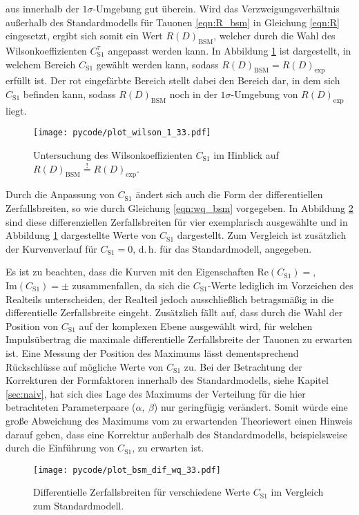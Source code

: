 aus \cite{Hiller2016} innerhalb der $\num{1}\sigma$-Umgebung gut überein.
Wird das Verzweigungsverhältnis außerhalb des Standardmodells für Tauonen \eqref{eqn:R_bsm} in Gleichung \eqref{eqn:R} eingesetzt, ergibt sich somit ein Wert $R(D)_{\text{BSM}}$, welcher durch die Wahl des Wilsonkoeffizienten $C_{\text{S}1}^{\tau}$ angepasst werden kann.
In Abbildung \ref{fig:wilson_1} ist dargestellt, in welchem Bereich $C_{\text{S}1}$ gewählt werden kann, sodass $R(D)_{\text{BSM}} = R(D)_{\text{exp}}$ erfüllt ist.
Der rot eingefärbte Bereich stellt dabei den Bereich dar, in dem sich $C_{\text{S}1}$ befinden kann, sodass $R(D)_{\text{BSM}}$ noch in der $\num{1}\sigma$-Umgebung von $R(D)_{\text{exp}}$ liegt.
\begin{figure}
  \centering
  \texttt{[image: pycode/plot\_wilson\_1\_33.pdf]}
  \caption{Untersuchung des Wilsonkoeffizienten $C_{\text{S}1}$ im Hinblick auf $R(D)_{\text{BSM}} \stackrel{!}{=} R(D)_{\text{exp}}$.}
  \label{fig:wilson_1}
\end{figure}
Durch die Anpassung von $C_{\text{S}1}$ ändert sich auch die Form der differentiellen Zerfallsbreiten, so wie durch Gleichung \eqref{eqn:wq_bsm} vorgegeben.
In Abbildung \ref{fig:wilson_2} sind diese differenziellen Zerfallsbreiten für vier exemplarisch ausgewählte und in Abbildung \ref{fig:wilson_1} dargestellte Werte von $C_{\text{S}1}$ dargestellt.
Zum Vergleich ist zusätzlich der Kurvenverlauf für $C_{\text{S}1} = \num{0}$, d.\,h. für das Standardmodell, angegeben.

Es ist zu beachten, dass die Kurven mit den Eigenschaften $\mathrm{Re}(C_{\text{S}1}) = $, $\mathrm{Im}(C_{\text{S}1}) = \pm$ zusammenfallen, da sich die $C_{\text{S}1}$-Werte lediglich im Vorzeichen des Realteils unterscheiden, der Realteil jedoch ausschließlich betragsmäßig in die differentielle Zerfallsbreite eingeht.
Zusätzlich fällt auf, dass durch die Wahl der Position von $C_{\text{S}1}$ auf der komplexen Ebene ausgewählt wird, für welchen Impulsübertrag die maximale differentielle Zerfallsbreite der Tauonen zu erwarten ist.
Eine Messung der Position des Maximums lässt dementsprechend Rückschlüsse auf mögliche Werte von $C_{\text{S}1}$ zu.
Bei der Betrachtung der Korrekturen der Formfaktoren innerhalb des Standardmodells, siehe Kapitel \ref{sec:naiv}, hat sich dies Lage des Maximums der Verteilung für die hier betrachteten Parameterpaare ($\alpha,\: \beta$) nur geringfügig verändert.
Somit würde eine große Abweichung des Maximums vom zu erwartenden Theoriewert einen Hinweis darauf geben, dass eine Korrektur außerhalb des Standardmodells, beispielsweise durch die Einführung von $C_{\text{S}1}$, zu erwarten ist.

\begin{figure}
  \centering
  \texttt{[image: pycode/plot\_bsm\_dif\_wq\_33.pdf]}
  \caption{Differentielle Zerfallsbreiten für verschiedene Werte $C_{\text{S}1}$ im Vergleich zum Standardmodell.}
  \label{fig:wilson_2}
\end{figure}
